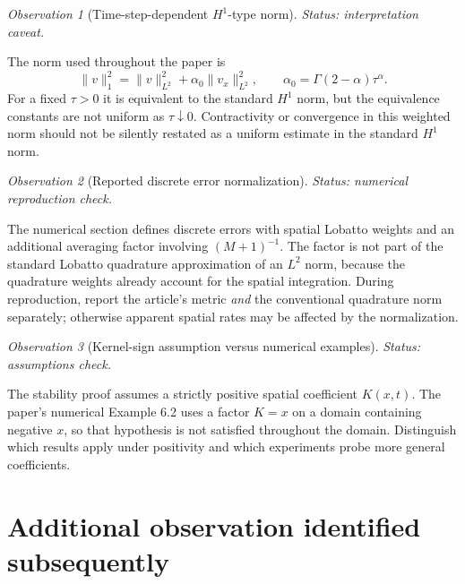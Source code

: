 \documentclass[11pt,a4paper]{amsart}
\theoremstyle{remark}
\newtheorem{observation}{Observation}
\theoremstyle{plain}
\theoremstyle{remark}
\newcommand{\auditstatus}[1]{\par\noindent\emph{#1.}\enspace}
\numberwithin{equation}{section}
\begin{document}
\begin{observation}[Time-step-dependent $H^1$-type norm]
\auditstatus{Status: interpretation caveat}

The norm used throughout the paper is
\[
\|v\|_1^2=\|v\|_{L^2}^2+\alpha_0\|v_x\|_{L^2}^2,
\qquad\alpha_0=\Gamma(2-\alpha)\tau^\alpha.
\]
For a fixed $\tau>0$ it is equivalent to the standard $H^1$ norm, but the equivalence constants are not uniform as $\tau\downarrow0$. Contractivity or convergence in this weighted norm should not be silently restated as a uniform estimate in the standard $H^1$ norm.
\end{observation}

\begin{observation}[Reported discrete error normalization]
\auditstatus{Status: numerical reproduction check}

The numerical section defines discrete errors with spatial Lobatto weights and an additional averaging factor involving $(M+1)^{-1}$. The factor is not part of the standard Lobatto quadrature approximation of an $L^2$ norm, because the quadrature weights already account for the spatial integration. During reproduction, report the article's metric \emph{and} the conventional quadrature norm separately; otherwise apparent spatial rates may be affected by the normalization.
\end{observation}

\begin{observation}[Kernel-sign assumption versus numerical examples]
\auditstatus{Status: assumptions check}

The stability proof assumes a strictly positive spatial coefficient $K(x,t)$. The paper's numerical Example 6.2 uses a factor $K=x$ on a domain containing negative $x$, so that hypothesis is not satisfied throughout the domain. Distinguish which results apply under positivity and which experiments probe more general coefficients.
\end{observation}

\section{Additional observation identified subsequently}
\label{sec:volterra-candidate}
\end{document}
